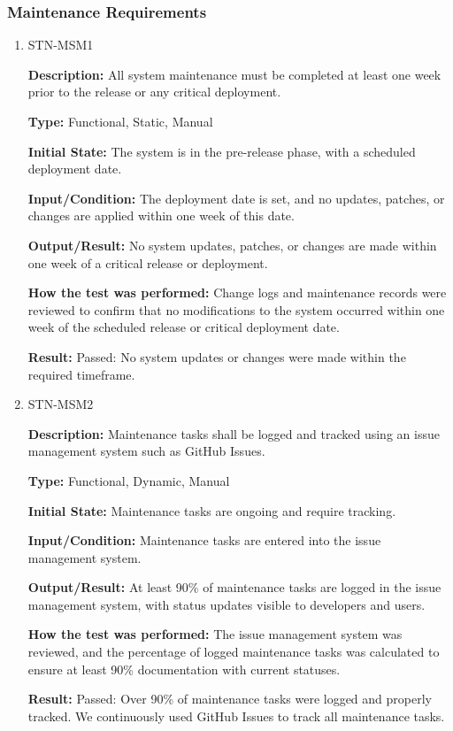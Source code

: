 \documentclass[12pt, titlepage]{article}
\begin{document}
\subsubsection{Maintenance Requirements}

\begin{enumerate}

\item{STN-MSM1\\}

\textbf{Description:} All system maintenance must be completed at least one week prior to the release or any critical deployment.

\textbf{Type:} Functional, Static, Manual

\textbf{Initial State:} The system is in the pre-release phase, with a scheduled deployment date.

\textbf{Input/Condition:} The deployment date is set, and no updates, patches, or changes are applied within one week of this date.

\textbf{Output/Result:} No system updates, patches, or changes are made within one week of a critical release or deployment.

\textbf{How the test was performed:} Change logs and maintenance records were reviewed to confirm that no modifications to the system occurred within one week of the scheduled release or critical deployment date.

\textbf{Result:} Passed: No system updates or changes were made within the required timeframe.

\item{STN-MSM2\\}

\textbf{Description:} Maintenance tasks shall be logged and tracked using an issue management system such as GitHub Issues.

\textbf{Type:} Functional, Dynamic, Manual

\textbf{Initial State:} Maintenance tasks are ongoing and require tracking.

\textbf{Input/Condition:} Maintenance tasks are entered into the issue management system.

\textbf{Output/Result:} At least 90\% of maintenance tasks are logged in the issue management system, with status updates visible to developers and users.

\textbf{How the test was performed:} The issue management system was reviewed, and the percentage of logged maintenance tasks was calculated to ensure at least 90\% documentation with current statuses.

\textbf{Result:} Passed: Over 90\% of maintenance tasks were logged and properly tracked. We continuously used GitHub Issues to track all maintenance tasks.

\end{enumerate}
\end{document}
